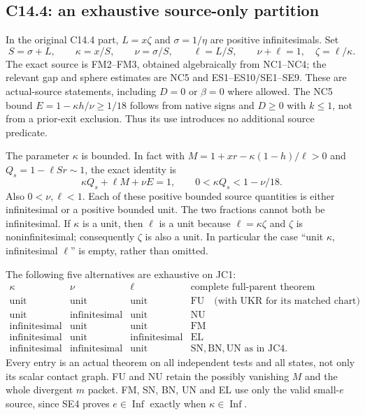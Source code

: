 \subsection{C14.4: an exhaustive source-only partition}
In the original C14.4 part, $L=x\zeta$ and $\sigma=1/\eta$ are
positive infinitesimals.  Set
\[
 S=\sigma+L,\qquad \kappa=x/S,\qquad
 \nu=\sigma/S,\qquad\ell=L/S,
 \qquad \nu+\ell=1,\quad\zeta=\ell/\kappa.          \tag{JC1}
\]
The exact source is FM2--FM3, obtained algebraically from NC1--NC4;
the relevant gap and sphere estimates are NC5 and ES1--ES10/SE1--SE9.
These are actual-source statements, including $D=0$ or $\beta=0$
where allowed.  The NC5 bound $E=1-\kappa h/\nu\ge1/18$ follows
from native signs and $D\ge0$ with $k\le1$, not from a prior-exit
exclusion.  Thus its use introduces no additional source predicate.

The parameter $\kappa$ is bounded.  In fact with
$M=1+xr-\kappa(1-h)/\ell>0$ and $Q_s=1-\ell Sr\sim1$,
the exact identity is
\[
 \kappa Q_s+\ell M+\nu E=1,
 \qquad 0<\kappa Q_s<1-\nu/18.                    \tag{JC2}
\]
Also $0<\nu,\ell<1$.  Each of these positive bounded source
quantities is either infinitesimal or a positive bounded unit.
The two fractions cannot both be infinitesimal.  If $\kappa$ is a
unit, then $\ell$ is a unit because $\ell=\kappa\zeta$ and
$\zeta$ is noninfinitesimal; consequently $\zeta$ is also a unit.
In particular the case ``unit $\kappa$, infinitesimal $\ell$'' is
empty, rather than omitted.

The following five alternatives are exhaustive on JC1:
\[
\begin{array}{c|c|c|l}
 \kappa&\nu&\ell&\text{complete full-parent theorem}\\ \hline
 \text{unit}&\text{unit}&\text{unit}&\mathrm{FU}\quad
       \text{(with UKR for its matched chart)}\\
 \text{unit}&\text{infinitesimal}&\text{unit}&\mathrm{NU}\\
 \text{infinitesimal}&\text{unit}&\text{unit}&\mathrm{FM}\\
 \text{infinitesimal}&\text{unit}&\text{infinitesimal}&\mathrm{EL}\\
 \text{infinitesimal}&\text{infinitesimal}&\text{unit}
       &\mathrm{SN},\mathrm{BN},\mathrm{UN}\text{ as in JC4}.
\end{array}                                                     \tag{JC3}
\]
Every entry is an actual theorem on all independent tests and all
states, not only its scalar contact graph.  FU and NU retain the
possibly vanishing $M$ and the whole divergent $m$ packet.
FM, SN, BN, UN and EL use only the valid small-$e$ source, since
SE4 proves $e\in\operatorname{Inf}$ exactly when
$\kappa\in\operatorname{Inf}$.

